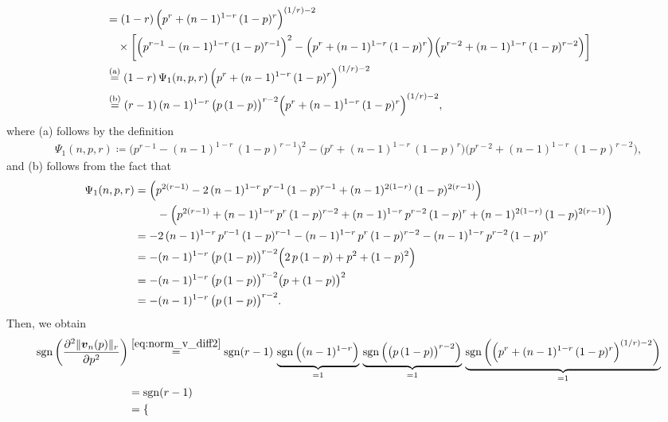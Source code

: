 \documentclass[conference, draftcls, onecolumn]{IEEEtran}
\theoremstyle{plain}
\newcommand{\bvec}[1]{\boldsymbol{#1}}
\newcommand{\sgn}{\operatorname{sgn}}
\newcommand{\lemref}[1]{Lemma~\ref{#1}}
\begin{document}
\begin{IEEEproof}[Proof of \lemref{lem:convex_v}]
\begin{align}
& =
(1 - r) \, \Big( p^{r} + (n-1)^{1-r} \, (1-p)^{r} \Big)^{(1/r) - 2}
\notag \\
& \quad \times
\bigg[ \Big( p^{r-1} - (n-1)^{1-r} \, (1-p)^{r-1} \Big)^{2} - \Big( p^{r} + (n-1)^{1-r} \, (1-p)^{r} \Big) \Big( p^{r-2} + (n-1)^{1-r} \, (1-p)^{r-2} \Big) \bigg]
\\
& \overset{\text{(a)}}{=}
(1 - r) \, \Psi_{1}(n, p, r) \, \Big( p^{r} + (n-1)^{1-r} \, (1-p)^{r} \Big)^{(1/r) - 2}
\\
& \overset{\text{(b)}}{=}
(r-1) \, (n-1)^{1-r} \, \big( p \, (1-p) \big)^{r-2} \Big( p^{r} + (n-1)^{1-r} \, (1-p)^{r} \Big)^{(1/r) - 2} ,
\label{eq:norm_v_diff2}
\end{align}
where (a) follows by the definition
\begin{align}
\Psi_{1}(n, p, r)
\coloneqq
\Big( p^{r-1} - (n-1)^{1-r} \, (1-p)^{r-1} \Big)^{2} - \Big( p^{r} + (n-1)^{1-r} \, (1-p)^{r} \Big) \Big( p^{r-2} + (n-1)^{1-r} \, (1-p)^{r-2} \Big) ,
\end{align}
and (b) follows from the fact that
\begin{align}
\Psi_{1}(n, p, r)
& =
\Big( p^{2(r-1)} - 2 \, (n-1)^{1-r} \, p^{r-1} \, (1-p)^{r-1} + (n-1)^{2(1-r)} \, (1-p)^{2(r-1)} \Big)
\notag \\
& \qquad
- \Big( p^{2(r-1)} + (n-1)^{1-r} \, p^{r} \, (1-p)^{r-2} + (n-1)^{1-r} \, p^{r-2} \, (1-p)^{r} + (n-1)^{2(1-r)} \, (1-p)^{2(r-1)} \Big)
\\
& =
- 2 \, (n-1)^{1-r} \, p^{r-1} \, (1-p)^{r-1} - (n-1)^{1-r} \, p^{r} \, (1-p)^{r-2} - (n-1)^{1-r} \, p^{r-2} \, (1-p)^{r}
\\
& =
- (n-1)^{1-r} \, \big( p \, (1 - p) \big)^{r-2} \Big( 2 \, p \, (1-p) + p^{2} + (1-p)^{2} \Big)
\\
& =
- (n-1)^{1-r} \, \big( p \, (1 - p) \big)^{r-2} \big( p + (1-p) \big)^{2}
\\
& =
- (n-1)^{1-r} \, \big( p \, (1 - p) \big)^{r-2} .
\end{align}
Then, we obtain
\begin{align}
\sgn \bigg( \frac{ \partial^{2} \| \bvec{v}_{n}( p ) \|_{r} }{ \partial p^{2} } \bigg)
& \overset{\eqref{eq:norm_v_diff2}}{=}
\sgn(r-1) \, \underbrace{ \sgn\Big( (n-1)^{1-r} \Big) }_{=1} \, \underbrace{ \sgn\Big( \big( p \, (1-p) \big)^{r-2} \Big) }_{=1} \, \underbrace{ \sgn\bigg( \Big( p^{r} + (n-1)^{1-r} \, (1-p)^{r} \Big)^{(1/r) - 2} \bigg) }_{=1}
\\
& =
\sgn(r-1)
\\
& =
\begin{cases}

\end{cases}
\end{align}
\end{IEEEproof}
\end{document}
